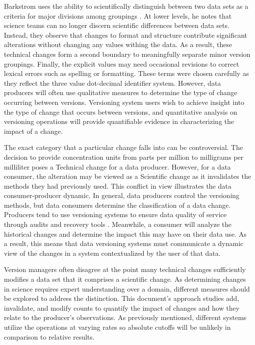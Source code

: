 Barkstrom uses the ability to scientifically distinguish between two data sets as a criteria for major divisions among groupings \cite{Barkstrom2003}.
At lower levels, he notes that science teams can no longer discern scientific differences between data sets.
Instead, they observe that changes to format and structure contribute significant alterations without changing any values withing the data.
As a result, these technical changes form a second boundary to meaningfully separate minor version groupings.
Finally, the explicit values may need occasional revisions to correct lexical errors such as spelling or formatting.
These terms were chosen carefully as they reflect the three value dot-decimal identifier system.
However, data producers will often use qualitative measures to determine the type of change occurring between versions.
Versioning system users wish to achieve insight into the type of change that occurs between versions, and quantitative analysis on versioning operations will provide quantifiable evidence in characterizing the impact of a change.

The exact category that a particular change falls into can be controversial.
The decision to provide concentration units from parts per million to milligrams per milliliter poses a Technical change for a data producer.
However, for a data consumer, the alteration may be viewed as a Scientific change as it invalidates the methods they had previously used.
This conflict in view illustrates the data consumer-producer dynamic.
In general, data producers control the versioning methods, but data consumers determine the classification of a data change.
Producers tend to use versioning systems to ensure data quality of service through audits and recovery tools \cite{Cavanaugh2002}.
Meanwhile, a consumer will analyze the historical changes and determine the impact this may have on their data use.
As a result, this means that data versioning systems must communicate a dynamic view of the changes in a system contextualized by the user of that data.

Version managers often disagree at the point many technical changes sufficiently modifies a data set that it comprises a scientific change.
As determining changes in science requires expert understanding over a domain, different measures should be explored to address the distinction.
This document's approach studies add, invalidate, and modify counts to quantify the impact of changes and how they relate to the producer's observations.
As previously mentioned, different systems utilize the operations at varying rates so absolute cutoffs will be unlikely in comparison to relative results.

